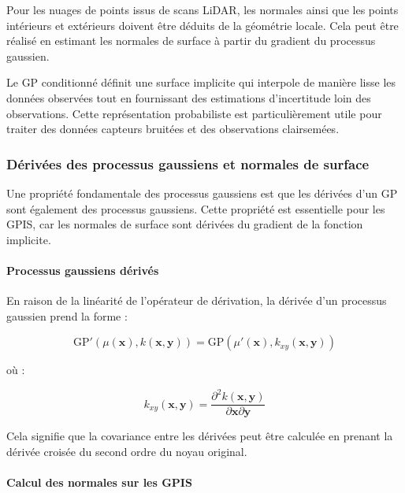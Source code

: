 Pour les nuages de points issus de scans LiDAR, les normales ainsi que les points intérieurs et extérieurs doivent être déduits de la géométrie locale. Cela peut être réalisé en estimant les normales de surface à partir du gradient du processus gaussien. \cite{martens2016gpis}

Le GP conditionné définit une surface implicite qui interpole de manière lisse les données observées tout en fournissant des estimations d'incertitude loin des observations. Cette représentation probabiliste est particulièrement utile pour traiter des données capteurs bruitées et des observations clairsemées.

\subsubsection{Dérivées des processus gaussiens et normales de surface}

Une propriété fondamentale des processus gaussiens est que les dérivées d'un GP sont également des processus gaussiens. Cette propriété est essentielle pour les GPIS, car les normales de surface sont dérivées du gradient de la fonction implicite.

\paragraph{Processus gaussiens dérivés}

En raison de la linéarité de l'opérateur de dérivation, la dérivée d'un processus gaussien prend la forme :

\begin{equation}
\text{GP}'(\mu(\mathbf{x}), k(\mathbf{x}, \mathbf{y})) = \text{GP}\left(\mu'(\mathbf{x}), k_{xy}(\mathbf{x}, \mathbf{y})\right)
\end{equation}

où :

\begin{equation}
k_{xy}(\mathbf{x}, \mathbf{y}) = \frac{\partial^2 k(\mathbf{x}, \mathbf{y})}{\partial \mathbf{x} \partial \mathbf{y}}
\end{equation}

Cela signifie que la covariance entre les dérivées peut être calculée en prenant la dérivée croisée du second ordre du noyau original.

\paragraph{Calcul des normales sur les GPIS}

